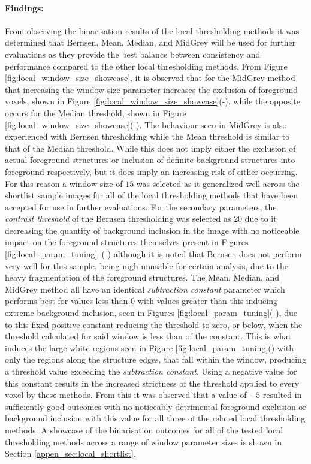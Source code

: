 \paragraph{Findings:} From observing the binarisation results of the local thresholding methods it was determined that Bernsen, Mean, Median, and MidGrey will be used for further evaluations as they provide the best balance between consistency and performance compared to the other local thresholding methods. From Figure \ref{fig:local_window_size_showcase}, it is observed that for the MidGrey method that increasing the window size parameter increases the exclusion of foreground voxels, shown in Figure \ref{fig:local_window_size_showcase}(-), while the opposite occurs for the Median threshold, shown in Figure \ref{fig:local_window_size_showcase}(-). The behaviour seen in MidGrey is also experienced with Bernsen thresholding while the Mean threshold is similar to that of the Median threshold. While this does not imply either the exclusion of actual foreground structures or inclusion of definite background structures into foreground respectively, but it does imply an increasing risk of either occurring. For this reason a window size of $15$ was selected as it generalized well across the shortlist sample images for all of the local thresholding methods that have been accepted for use in further evaluations. For the secondary parameters, the \textit{contrast threshold} of the Bernsen thresholding was selected as $20$ due to it decreasing the quantity of background inclusion in the image with no noticeable impact on the foreground structures themselves present in Figures \ref{fig:local_param_tuning}~(-) although it is noted that Bernsen does not perform very well for this sample, being nigh unusable for certain analysis, due to the heavy fragmentation of the foreground structures. The Mean, Median, and MidGrey method all have an identical \textit{subtraction constant} parameter which performs best for values less than $0$ with values greater than this inducing extreme background inclusion, seen in Figures \ref{fig:local_param_tuning}(-), due to this fixed positive constant reducing the threshold to zero, or below, when the threshold calculated for said window is less than of the constant. This is what induces the large white regions seen in Figure \ref{fig:local_param_tuning}() with only the regions along the structure edges, that fall within the window, producing a threshold value exceeding the \textit{subtraction constant}. Using a negative value for this constant results in the increased strictness of the threshold applied to every voxel by these methods. From this it was observed that a value of $-5$ resulted in sufficiently good outcomes with no noticeably detrimental foreground exclusion or background inclusion with this value for all three of the related local thresholding methods. A showcase of the binarisation outcomes for all of the tested local thresholding methods across a range of window parameter sizes is shown in Section \ref{appen_sec:local_shortlist}.

